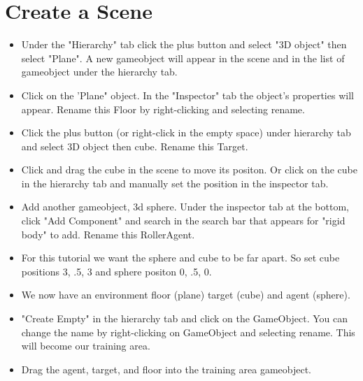 \documentclass[11pt,fleqn,openany]{book} %
\begin{document}
\section{Create a Scene}
\begin{itemize}
    \item Under the "Hierarchy" tab click the plus button and select "3D object" then select "Plane". A new gameobject will appear in the scene and in the list of gameobject under the hierarchy tab. 
    \item Click on the 'Plane" object. In the "Inspector" tab the object's properties will appear. Rename this Floor by right-clicking and selecting rename.
    \item Click the plus button (or right-click in the empty space) under hierarchy tab and select 3D object then cube. Rename this Target.
    \item Click and drag the cube in the scene to move its positon. Or click on the cube in the hierarchy tab and manually set the position in the inspector tab. 
    \item Add another gameobject, 3d sphere. Under the inspector tab at the bottom, click "Add Component" and search in the search bar that appears for "rigid body" to add. Rename this RollerAgent.
    \item For this tutorial we want the sphere and cube to be far apart. So set cube positions 3, .5, 3 and sphere positon 0, .5,  0.
    \item We now have an environment floor (plane) target (cube) and agent (sphere).
    \item "Create Empty" in the hierarchy tab and click on the GameObject. You can change the name by right-clicking on GameObject and selecting rename. This will become our training area.
    \item Drag the agent, target, and floor into the training area gameobject.
\end{itemize}
\end{document}

